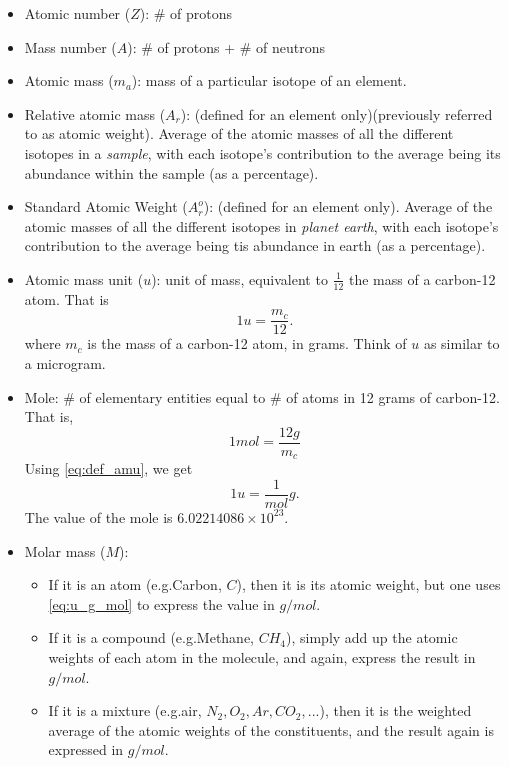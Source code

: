\documentclass[a4paper,11pt]{report}
\begin{document}
\begin{itemize}

\item Atomic number ($Z$): \# of protons

\item Mass number ($A$): \# of protons + \# of neutrons

\item Atomic mass ($m_a$): mass of a particular isotope of an element.

\item Relative atomic mass ($A_r$): (defined for an element only)(previously referred to as atomic weight). Average of the atomic masses of all the different isotopes in a \textit{sample}, with each isotope's contribution to the average being its abundance within the sample (as a percentage).

\item Standard Atomic Weight ($A_r^o$): (defined for an element only). Average of the atomic masses of all the different isotopes in \textit{planet earth}, with each isotope's contribution to the average being tis abundance in earth (as a percentage).

\item Atomic mass unit ($u$): unit of mass, equivalent to $\frac{1}{12}$ the mass of a carbon-12 atom. That is 
\begin{equation}
\label{eq:def_amu}
1u = \frac{m_c}{12}.
\end{equation}
where $m_c$ is the mass of a carbon-12 atom, in grams. Think of $u$ as similar to a microgram.

\item Mole: \# of elementary entities equal to \# of atoms in 12 grams of carbon-12. That is,
\begin{equation}
1 mol = \frac{12g}{m_c}
\end{equation}
Using \cref{eq:def_amu}, we get
\begin{equation}
\label{eq:u_g_mol}
1u = \frac{1}{mol} g.
\end{equation}
The value of the mole is $6.02214086 \times 10^{23}$.

\item Molar mass ($M$): 
\begin{itemize}
    \item If it is an atom (e.g.\@ Carbon, $C$), then it is its atomic weight, but one uses \cref{eq:u_g_mol} to express the value in $g/mol$. 
    \item If it is a compound (e.g.\@ Methane, $CH_4$), simply add up the atomic weights of each atom in the molecule, and again, express the result in $g/mol$.
    \item If it is a mixture (e.g.\@ air, $N_2,O_2,Ar,CO_2,...$), then it is the weighted average of the atomic weights of the constituents, and the result again is expressed in $g/mol$.
\end{itemize}


\end{itemize}
\end{document}
